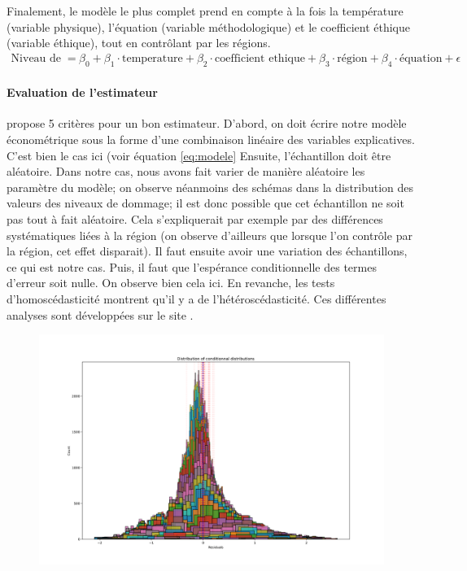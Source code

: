 Finalement, le modèle le plus complet prend en compte à la fois la température (variable physique), l'équation (variable méthodologique) et le coefficient éthique (variable éthique), tout en contrôlant par les régions. 
\begin{align}
\text{Niveau de dommage} = & \ \beta_0  + \beta_1 \cdot \text{temperature}  + \beta_2 \cdot \text{coefficient ethique} + \beta_3 \cdot \text{région} + \beta_4 \cdot \text{équation} + \epsilon
\end{align}
\paragraph{Evaluation de l'estimateur} \cite{wooldridge_introductory_2016} propose 5 critères pour un bon estimateur. D'abord, on doit écrire notre modèle économétrique sous la forme d'une combinaison linéaire des variables explicatives. C'est bien le cas ici (voir équation \ref{eq:modele} Ensuite, l'échantillon doit être aléatoire. Dans notre cas, nous avons fait varier de manière aléatoire les paramètre du modèle; on observe néanmoins des schémas dans la distribution des valeurs des niveaux de dommage; il est donc possible que cet échantillon ne soit pas tout à fait aléatoire. Cela s'expliquerait par exemple par des différences systématiques liées à la région (on observe d'ailleurs que lorsque l'on contrôle par la région, cet effet disparait).  Il faut ensuite avoir une variation des échantillons, ce qui est notre cas. Puis, il faut que l'espérance conditionnelle des termes d'erreur soit nulle. On observe bien cela ici. En revanche, les tests d'homoscédasticité montrent qu'il y a de l'hétéroscédasticité.  Ces différentes analyses sont développées sur le site .

\begin{figure}
    \centering
    \includegraphics[width=\linewidth]{results/slr_4_2.png}
    \label{fig:slr_4}
\end{figure}

